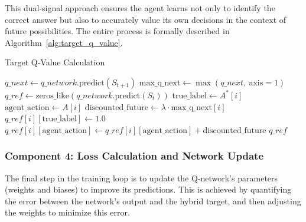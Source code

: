 \documentclass[16pt]{report}
\begin{document}
This dual-signal approach ensures the agent learns not only to identify the correct answer but also to accurately value its own decisions in the context of future possibilities. The entire process is formally described in Algorithm~\ref{alg:target_q_value}.

\begin{algorithm}[H]
\caption{Target Q-Value Calculation}
\label{alg:target_q_value}
\begin{algorithmic}[1]
    \State $q\_next \gets q\_network.\text{predict}(S_{t+1})$
    \State $\text{max\_q\_next} \gets \max(q\_next,\ \text{axis}=1)$
    \State $q\_ref \gets \text{zeros\_like}(q\_network.\text{predict}(S_t))$
        \State $\text{true\_label} \gets A^*[i]$
        \State $\text{agent\_action} \gets A[i]$
        \State $\text{discounted\_future} \gets \lambda \cdot \text{max\_q\_next}[i]$
        \State $q\_ref[i][\text{true\_label}] \gets 1.0$
        \State $q\_ref[i][\text{agent\_action}] \gets q\_ref[i][\text{agent\_action}] + \text{discounted\_future}$
    \EndFor
    \State \Return $q\_ref$
\EndFunction
\end{algorithmic}
\end{algorithm}

\subsubsection{Component 4: Loss Calculation and Network Update}

The final step in the training loop is to update the Q-network’s parameters (weights and biases) to improve its predictions. This is achieved by quantifying the error between the network’s output and the hybrid target, and then adjusting the weights to minimize this error.
\end{document}
